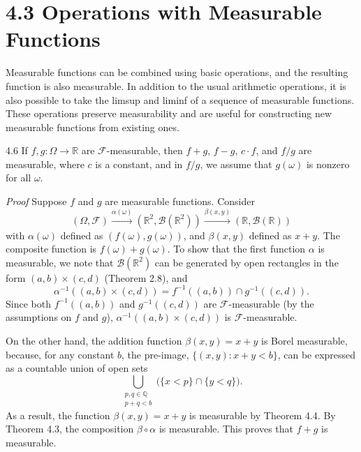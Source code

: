 \section*{4.3 Operations with Measurable Functions}

Measurable functions can be combined using basic operations, and the resulting function is also measurable. In addition to the usual arithmetic operations, it is also possible to take the limsup and liminf of a sequence of measurable functions. These operations preserve measurability and are useful for constructing new measurable functions from existing ones.

\begin{thmbox}{4.6}
If $f, g : \Omega \to \mathbb{R}$ are $\mathcal{F}$-measurable, then $f + g$, $f - g$, $c \cdot f$, and $f/g$ are measurable, where $c$ is a constant, and in $f/g$, we assume that $g(\omega)$ is nonzero for all $\omega$.
\end{thmbox}

\noindent\textit{Proof} Suppose $f$ and $g$ are measurable functions. Consider
\[
(\Omega, \mathcal{F}) \xrightarrow{\alpha(\omega)} (\mathbb{R}^2, \mathcal{B}(\mathbb{R}^2)) \xrightarrow{\beta(x, y)} (\mathbb{R}, \mathcal{B}(\mathbb{R}))
\]
with $\alpha(\omega)$ defined as $(f(\omega), g(\omega))$, and $\beta(x, y)$ defined as $x + y$. The composite function is $f(\omega) + g(\omega)$. To show that the first function $\alpha$ is measurable, we note that $\mathcal{B}(\mathbb{R}^2)$ can be generated by open rectangles in the form $(a, b) \times (c, d)$ (Theorem 2.8), and
\[
\alpha^{-1}((a, b) \times (c, d)) = f^{-1}((a, b)) \cap g^{-1}((c, d)).
\]
Since both $f^{-1}((a, b))$ and $g^{-1}((c, d))$ are $\mathcal{F}$-measurable (by the assumptions on $f$ and $g$), $\alpha^{-1}((a, b) \times (c, d))$ is $\mathcal{F}$-measurable.

On the other hand, the addition function $\beta(x, y) = x + y$ is Borel measurable, because, for any constant $b$, the pre-image, $\{(x, y) : x + y < b\}$, can be expressed as a countable union of open sets
\[
\bigcup_{\substack{p, q \in \mathbb{Q} \\ p+q < b}} \bigl( \{x < p\} \cap \{y < q\} \bigr).
\]
As a result, the function $\beta(x, y) = x + y$ is measurable by Theorem 4.4. By Theorem 4.3, the composition $\beta \circ \alpha$ is measurable. This proves that $f + g$ is measurable.

